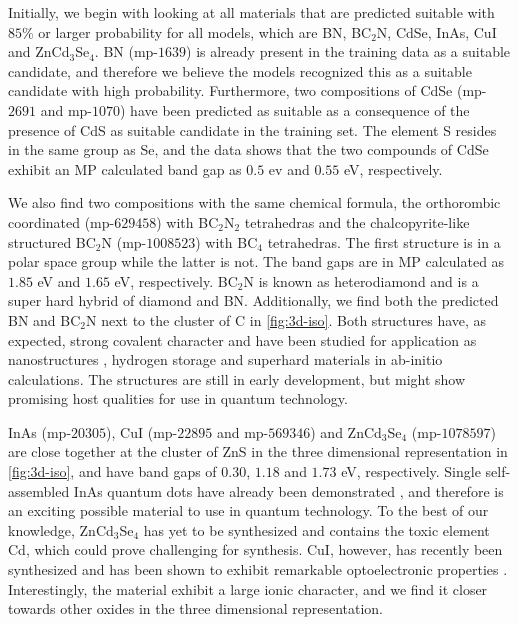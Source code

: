 



\noindent Initially, we begin with looking at all materials that are predicted suitable with $85\%$ or larger probability for all models, which are BN, BC$_2$N, CdSe, InAs, CuI and ZnCd$_3$Se$_4$. BN (mp-$1639$) is already present in the training data as a suitable candidate, and therefore we believe the models recognized this as a suitable candidate with high probability. Furthermore, two compositions of CdSe (mp-$2691$ and mp-$1070$) have been predicted as suitable as a consequence of the presence of CdS as suitable candidate in the training set. The element S resides in the same group as Se, and the data shows that the two compounds of CdSe exhibit an MP calculated band gap as $0.5$ ev and $0.55$ eV, respectively.

We also find two compositions with the same chemical formula, the orthorombic coordinated (mp-$629458$) with BC$_2$N$_2$ tetrahedras and the chalcopyrite-like structured BC$_2$N (mp-$1008523$) with BC$_4$ tetrahedras. The first structure is in a polar space group while the latter is not. The band gaps are in MP calculated as $1.85$ eV and $1.65$ eV, respectively. BC$_2$N is known as heterodiamond and is a super hard hybrid of diamond and BN. Additionally, we find both the predicted BN and BC$_2$N next to the cluster of C in \autoref{fig:3d-iso}. Both structures have, as expected, strong covalent character and have been studied for application as nanostructures \cite{Gao2017}, hydrogen storage \cite{Cai2017} and superhard materials \cite{Li2017, Jiang2020} in ab-initio calculations. The structures are still in early development, but might show promising host qualities for use in quantum technology.

InAs (mp-$20305$), CuI (mp-$22895$ and mp-$569346$) and ZnCd$_3$Se$_4$ (mp-$1078597$) are close together at the cluster of ZnS in the three dimensional representation in \autoref{fig:3d-iso}, and have band gaps of $0.30$, $1.18$ and $1.73$ eV, respectively. Single self-assembled InAs quantum dots have already been demonstrated \cite{Liu2018}, and therefore is an exciting possible material to use in quantum technology. To the best of our knowledge, ZnCd$_3$Se$_4$ has yet to be synthesized and contains the toxic element Cd, which could prove challenging for synthesis. CuI, however, has recently been synthesized and has been shown to exhibit remarkable optoelectronic properties \cite{Ahn2020}. Interestingly, the material exhibit a large ionic character, and we find it closer towards other oxides in the three dimensional representation.

